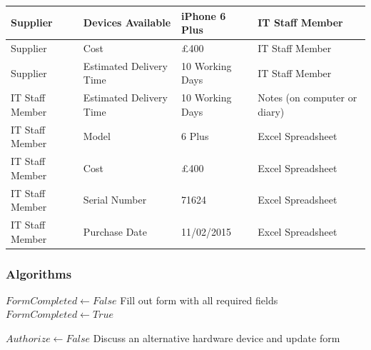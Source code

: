 \begin{center}
\begin{tabular}{|p{3cm}|p{3cm}|p{4cm}|p{3cm}|}
Supplier & Devices Available & iPhone 6 Plus & IT Staff Member \\ \hline
Supplier & Cost & £400 &IT Staff Member \\ \hline
Supplier & Estimated Delivery Time & 10 Working Days & IT Staff Member \\ \hline
IT Staff Member & Estimated Delivery Time & 10 Working Days & Notes (on computer or diary) \\ \hline
IT Staff Member                             & Model                              & 6 Plus                                             & Excel Spreadsheet                                       \\ \hline
IT Staff Member                       & Cost                              & £400                                               & Excel Spreadsheet        \\ \hline
IT Staff Member                       & Serial Number                      & 71624                                          &  Excel Spreadsheet           \\ \hline
IT Staff Member                       & Purchase Date                      & 11/02/2015                                         &  Excel Spreadsheet           \\ \hline
\end{tabular}
\end{center}

\subsubsection{Algorithms}

\begin{algorithm}[H]
\begin{algorithmic}
\State $FormCompleted  \leftarrow False$
	\State Fill out form with all required fields
	\State $FormCompleted \leftarrow True$
\Else
\EndIf
\end{algorithmic}
\end{algorithm}

\begin{algorithm}[H]
\begin{algorithmic}
\State$Authorize \leftarrow False$
		\State Discuss an alternative hardware device and update form
	\Else
	\EndIf
\EndWhile
\end{algorithmic}
\end{algorithm}


